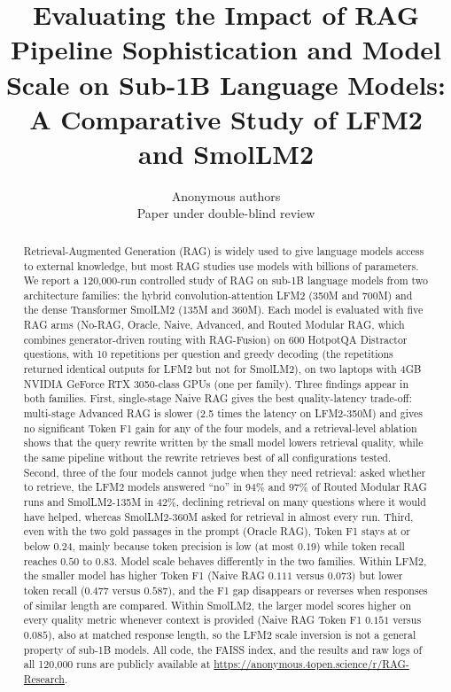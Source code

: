 \documentclass[10pt]{article}
\title{Evaluating the Impact of RAG Pipeline Sophistication and Model Scale on Sub-1B Language Models: A Comparative Study of LFM2 and SmolLM2}
\author{Anonymous authors\\
Paper under double-blind review}
\def\openreview{\url{https://anonymous.4open.science/r/RAG-Research}}
\begin{document}
\maketitle

\begin{abstract}
Retrieval-Augmented Generation (RAG) is widely used to give language models access to external knowledge, but most RAG studies use models with billions of parameters. We report a 120,000-run controlled study of RAG on sub-1B language models from two architecture families: the hybrid convolution-attention LFM2 (350M and 700M) and the dense Transformer SmolLM2 (135M and 360M). Each model is evaluated with five RAG arms (No-RAG, Oracle, Naive, Advanced, and Routed Modular RAG, which combines generator-driven routing with RAG-Fusion) on 600 HotpotQA Distractor questions, with 10 repetitions per question and greedy decoding (the repetitions returned identical outputs for LFM2 but not for SmolLM2), on two laptops with 4GB NVIDIA GeForce RTX 3050-class GPUs (one per family). Three findings appear in both families. First, single-stage Naive RAG gives the best quality-latency trade-off: multi-stage Advanced RAG is slower (2.5 times the latency on LFM2-350M) and gives no significant Token F1 gain for any of the four models, and a retrieval-level ablation shows that the query rewrite written by the small model lowers retrieval quality, while the same pipeline without the rewrite retrieves best of all configurations tested. Second, three of the four models cannot judge when they need retrieval: asked whether to retrieve, the LFM2 models answered ``no'' in 94\% and 97\% of Routed Modular RAG runs and SmolLM2-135M in 42\%, declining retrieval on many questions where it would have helped, whereas SmolLM2-360M asked for retrieval in almost every run. Third, even with the two gold passages in the prompt (Oracle RAG), Token F1 stays at or below $0.24$, mainly because token precision is low (at most $0.19$) while token recall reaches $0.50$ to $0.83$. Model scale behaves differently in the two families. Within LFM2, the smaller model has higher Token F1 (Naive RAG $0.111$ versus $0.073$) but lower token recall ($0.477$ versus $0.587$), and the F1 gap disappears or reverses when responses of similar length are compared. Within SmolLM2, the larger model scores higher on every quality metric whenever context is provided (Naive RAG Token F1 $0.151$ versus $0.085$), also at matched response length, so the LFM2 scale inversion is not a general property of sub-1B models. All code, the FAISS index, and the results and raw logs of all 120,000 runs are publicly available at \openreview.
\end{abstract}
\end{document}
